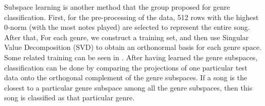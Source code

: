 \begin{par}
    \par \hspace{15pt} Subspace learning is another method that the group proposed for genre classification. First, for the pre-processing of the data, 512 rows with the highest 0-norm (with the most notes played) are selected to represent the entire song. After that, For each genre, we construct a training set, and then use Singular Value Decomposition (SVD) to obtain an orthonormal basis for each genre space. Some related training can be seen in \cite{pca}. After having learned the genre subspaces, classification can be done by comparing the projections of one particular test data onto the orthogonal complement of the genre subspaces. If a song is the closest to a particular genre subspace among all the genre subspaces, then this song is classified as that particular genre. 
\end{par}


